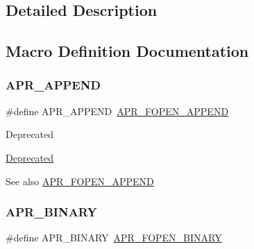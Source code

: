\subsection{Detailed Description}


\subsection{Macro Definition Documentation}
\mbox{\label{group__apr__file__open__flags_ga26d3de2bae5c90e5124869f56c141c2e}} 
\subsubsection{\texorpdfstring{A\+P\+R\+\_\+\+A\+P\+P\+E\+ND}{APR\_APPEND}}
{\footnotesize\ttfamily \#define A\+P\+R\+\_\+\+A\+P\+P\+E\+ND~\mbox{\hyperlink{group__apr__file__open__flags_ga45f353db9b71d4760a3f35cf3781cfc8}{A\+P\+R\+\_\+\+F\+O\+P\+E\+N\+\_\+\+A\+P\+P\+E\+ND}}}

\begin{DoxyRefDesc}{Deprecated}
\item[\mbox{\hyperlink{deprecated__deprecated000020}{Deprecated}}]\end{DoxyRefDesc}
\begin{DoxySeeAlso}{See also}
\mbox{\hyperlink{group__apr__file__open__flags_ga45f353db9b71d4760a3f35cf3781cfc8}{A\+P\+R\+\_\+\+F\+O\+P\+E\+N\+\_\+\+A\+P\+P\+E\+ND}} 
\end{DoxySeeAlso}
\mbox{\label{group__apr__file__open__flags_ga0e7556bac0cc0d1dafdf38952a4e4015}} 
\subsubsection{\texorpdfstring{A\+P\+R\+\_\+\+B\+I\+N\+A\+RY}{APR\_BINARY}}
{\footnotesize\ttfamily \#define A\+P\+R\+\_\+\+B\+I\+N\+A\+RY~\mbox{\hyperlink{group__apr__file__open__flags_gacb20b3028864f34cb26314fe2cacc3fa}{A\+P\+R\+\_\+\+F\+O\+P\+E\+N\+\_\+\+B\+I\+N\+A\+RY}}}

